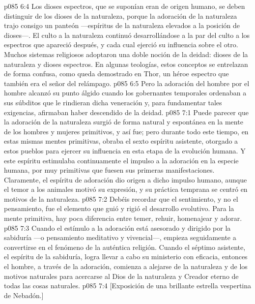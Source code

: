 \vs p085 6:4 Los dioses espectros, que se suponían eran de origen humano, se deben distinguir de los dioses de la naturaleza, porque la adoración de la naturaleza trajo consigo un panteón ---espíritus de la naturaleza elevados a la posición de dioses---. El culto a la naturaleza continuó desarrollándose a la par del culto a los espectros que apareció después, y cada cual ejerció su influencia sobre el otro. Muchos sistemas religiosos adoptaron una doble noción de la deidad: dioses de la naturaleza y dioses espectros. En algunas teologías, estos conceptos se entrelazan de forma confusa, como queda demostrado en Thor, un héroe espectro que también era el señor del relámpago.
\vs p085 6:5 Pero la adoración del hombre por el hombre alcanzó su punto álgido cuando los gobernantes temporales ordenaban a sus súbditos que le rindieran dicha veneración y, para fundamentar tales exigencias, afirmaban haber descendido de la deidad.
\vs p085 7:1 Puede parecer que la adoración de la naturaleza surgió de forma natural y espontánea en la mente de los hombres y mujeres primitivos, y así fue; pero durante todo este tiempo, en estas mismas mentes primitivas, obraba el sexto espíritu asistente, otorgado a estos pueblos para ejercer su influencia en esta etapa de la evolución humana. Y este espíritu estimulaba continuamente el impulso a la adoración en la especie humana, por muy primitivas que fuesen sus primeras manifestaciones. Claramente, el espíritu de adoración dio origen a dicho impulso humano, aunque el temor a los animales motivó su expresión, y su práctica temprana se centró en motivos de la naturaleza.
\vs p085 7:2 Debéis recordar que el sentimiento, y no el pensamiento, fue el elemento que guió y rigió el desarrollo evolutivo. Para la mente primitiva, hay poca diferencia entre temer, rehuir, homenajear y adorar.
\vs p085 7:3 Cuando el estímulo a la adoración está asesorado y dirigido por la sabiduría ---o pensamiento meditativo y vivencial---, empieza seguidamente a convertirse en el fenómeno de la auténtica religión. Cuando el séptimo asistente, el espíritu de la sabiduría, logra llevar a cabo su ministerio con eficacia, entonces el hombre, a través de la adoración, comienza a alejarse de la naturaleza y de los motivos naturales para acercarse al Dios de la naturaleza y Creador eterno de todas las cosas naturales.
\vsetoff
\vs p085 7:4 [Exposición de una brillante estrella vespertina de Nebadón.]
